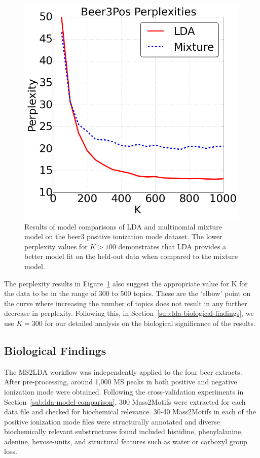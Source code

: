 \begin{figure}[!htbp]
\centering\includegraphics[width=0.5\linewidth]{07-lda/figures/perplexity.png}
\centering\caption{Results of model comparisons of LDA and multinomial mixture model on the beer3 positive ionization mode dataset. The lower perplexity values for $K>100$ demonstrates that LDA provides a better model fit on the held-out data when compared to the mixture model.\label{fig:m2lda-perplexity}}
\end{figure}

The perplexity results in Figure~\ref{fig:m2lda-perplexity} also suggest the appropriate value for K for the data to be in the range of 300 to 500 topics. These are the `elbow' point on the curve where increasing the number of topics does not result in any further decrease in perplexity. Following this, in Section~\ref{sub:lda-biological-findings}, we use $K=300$ for our detailed analysis on the biological significance of the results.

\subsection{Biological Findings\label{sub:lda-biological-findings}}

The MS2LDA workflow was independently applied to the four beer extracts. After pre-processing, around 1,000 MS peaks in both positive and negative ionization mode were obtained. Following the cross-validation experiments in Section~\ref{sub:lda-model-comparison}, 300 Mass2Motifs were extracted for each data file and checked for biochemical relevance. 30-40 Mass2Motifs in each of the positive ionization mode files were structurally annotated and diverse biochemically relevant substructures found included histidine, phenylalanine, adenine, hexose-units, and structural features such as water or carboxyl group loss.

